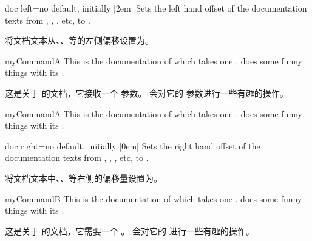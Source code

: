 \begin{docTcbKey}{doc left}{=}{no default, initially |2em|}
Sets the left hand offset of the documentation texts from
, , , etc, to .

将文档文本从、、等的左侧偏移设置为。
\begin{dispExample}
\begin{docCommand*}[doc left=2cm,doc left indent=-2cm]{myCommandA}{}
This is the documentation of  which takes one .
 does some funny things with its .

这是关于  的文档，它接收一个  参数。  会对它的  参数进行一些有趣的操作。
\end{docCommand*}
\end{dispExample}

\begin{dispExample}
\begin{docCommand*}[doc left indent=-2cm]{myCommandA}{}
This is the documentation of  which takes one .
 does some funny things with its .
\end{docCommand*}
\end{dispExample}
\end{docTcbKey}

\begin{docTcbKey}{doc right}{=}{no default, initially |0em|}
Sets the right hand offset of the documentation texts from
, , , etc, to .

将文档文本中、、等右侧的偏移量设置为。
\begin{dispExample}
\begin{docCommand*}[doc right=2cm]{myCommandB}{}
This is the documentation of  which takes one .
 does some funny things with its .

这是关于  的文档，它需要一个 。  会对它的  进行一些有趣的操作。
\end{docCommand*}
\end{dispExample}
\end{docTcbKey}

